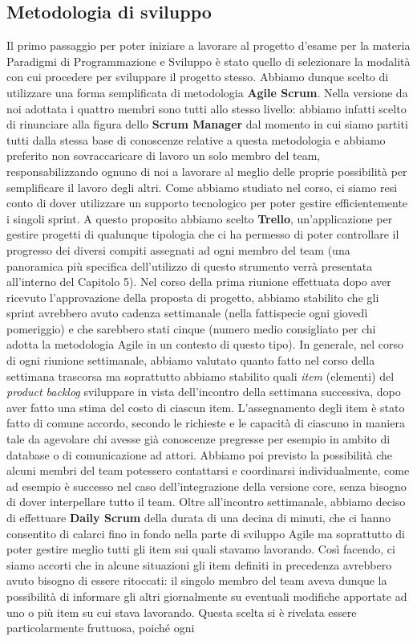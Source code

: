         \subsection {Metodologia di sviluppo}\label{subsec:metodology}
        Il primo passaggio per poter iniziare a lavorare al progetto d'esame per la materia Paradigmi di Programmazione e Sviluppo è stato quello di selezionare la modalità con cui procedere per sviluppare il progetto stesso. Abbiamo dunque scelto di utilizzare una forma semplificata di metodologia \textbf{Agile Scrum}. Nella versione da noi adottata i quattro membri sono tutti allo stesso livello: abbiamo infatti scelto di rinunciare alla figura dello \textbf{Scrum Manager} dal momento in cui siamo partiti tutti dalla stessa base di conoscenze relative a questa metodologia e abbiamo preferito non sovraccaricare di lavoro un solo membro del team, responsabilizzando ognuno di noi a lavorare al meglio delle proprie possibilità per semplificare il lavoro degli altri. Come abbiamo studiato nel corso, ci siamo resi conto di dover utilizzare un supporto tecnologico per poter gestire efficientemente i singoli sprint. A questo proposito abbiamo scelto \textbf{Trello}, un'applicazione per gestire progetti di qualunque tipologia che ci ha permesso di poter controllare il progresso dei diversi compiti assegnati ad ogni membro del team (una panoramica più specifica dell'utilizzo di questo strumento verrà presentata all'interno del Capitolo 5). Nel corso della prima riunione effettuata dopo aver ricevuto l'approvazione della proposta di progetto, abbiamo stabilito che gli sprint avrebbero avuto cadenza settimanale (nella fattispecie ogni giovedì pomeriggio) e che sarebbero stati cinque (numero medio consigliato per chi adotta la metodologia Agile in un contesto di questo tipo). In generale, nel corso di ogni riunione settimanale, abbiamo valutato quanto fatto nel corso della settimana trascorsa ma soprattutto abbiamo stabilito quali \textit{item} (elementi) del \textit{product backlog} sviluppare in vista dell'incontro della settimana successiva, dopo aver fatto una stima del costo di ciascun item. L'assegnamento degli item è stato fatto di comune accordo, secondo le richieste e le capacità di ciascuno in maniera tale da agevolare chi avesse già conoscenze pregresse per esempio in ambito di database o di comunicazione ad attori. Abbiamo poi previsto la possibilità che alcuni membri del team potessero contattarsi e coordinarsi individualmente, come ad esempio è successo nel caso dell'integrazione della versione core, senza bisogno di dover interpellare tutto il team. Oltre all'incontro settimanale, abbiamo deciso di effettuare \textbf{Daily Scrum} della durata di una decina di minuti, che ci hanno consentito di calarci fino in fondo nella parte di sviluppo Agile ma soprattutto di poter gestire meglio tutti gli item sui quali stavamo lavorando. Così facendo, ci siamo accorti che in alcune situazioni gli item definiti in precedenza avrebbero avuto bisogno di essere ritoccati: il singolo membro del team aveva dunque la possibilità di informare gli altri giornalmente su eventuali modifiche apportate ad uno o più item su cui stava lavorando. Questa scelta si è rivelata essere particolarmente fruttuosa, poiché ogni 
